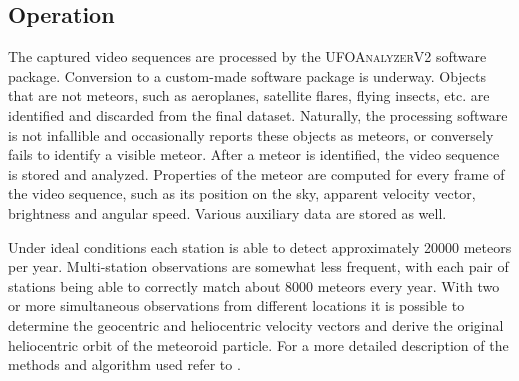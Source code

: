     \subsection{Operation} \label{iAo}
        The captured video sequences are processed by the \textsc{UFOAnalyzerV2} software package.
        Conversion to a custom-made software package is underway.
        Objects that are not meteors, such as aeroplanes, satellite flares, flying insects, etc.
        are identified and discarded from the final dataset. Naturally, the processing software is not
        infallible and occasionally reports these objects as meteors, or conversely fails to identify a visible meteor.
        After a meteor is identified, the video sequence is stored and analyzed.
        Properties of the meteor are computed for every frame of the video sequence,
        such as its position on the sky, apparent velocity vector, brightness and angular speed.
        Various auxiliary data are stored as well.

        Under ideal conditions each station is able to detect approximately 20000 meteors per year.
        Multi-station observations are somewhat less frequent, with each pair of stations being able
        to correctly match about 8000 meteors every year.
        With two or more simultaneous observations from different locations it is possible to determine
        the geocentric and heliocentric velocity vectors and derive the original heliocentric orbit of the meteoroid particle.
        For a more detailed description of the methods and algorithm used refer to \citet{kornos+2015}.

